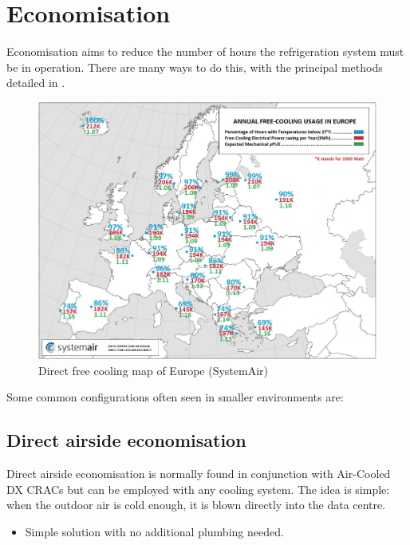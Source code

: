\documentclass{pgnotes}
\begin{document}

\section{Economisation}
\label{sec:economisation}

Economisation aims to reduce the number of hours the refrigeration system must be in operation.
There are many ways to do this, with the principal methods detailed in \citet{niemann:2011:economizer}.

\begin{figure}[htbp]
  \centering
  \includegraphics[width=0.75\linewidth]{free_cooling_europe_map_systemair}
  \caption{Direct free cooling map of Europe (SystemAir)}
  \label{fig:direct-free-cooling-map-europe}
\end{figure}


Some common configurations often seen in smaller environments are: 

\subsection{Direct airside economisation}

Direct airside economisation is normally found in conjunction with Air-Cooled DX CRACs but can be employed with any cooling system.
The idea is simple: when the outdoor air is cold enough, it is blown directly into the data centre.
\begin{itemize}
\item Simple solution with no additional plumbing needed.
\end{itemize}
\end{document}
